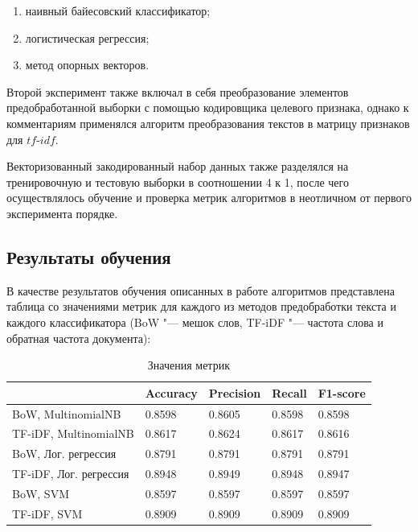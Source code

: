 \documentclass[bachelor, och, coursework]{SCWorks}
\begin{document}
        \begin{enumerate}
            \item наивный байесовский классификатор;
            \item логистическая регрессия;
            \item метод опорных векторов.
        \end{enumerate}

        Второй эксперимент также включал в себя преобразование элементов
        предобработанной выборки с помощью кодировщика целевого признака, однако
        к комментариям применялся алгоритм преобразования текстов в матрицу
        признаков для $tf \text{-} idf$.

        Векторизованный закодированный набор данных также разделялся на
        тренировочную и тестовую выборки в соотношении 4 к 1, после чего
        осуществлялось обучение и проверка метрик алгоритмов в неотличном от
        первого эксперимента порядке.

    \subsection{Результаты обучения}

        В качестве результатов обучения описанных в работе алгоритмов
        представлена таблица со значениями метрик для каждого из методов
        предобработки текста и каждого классификатора (BoW "--- мешок слов,
        TF-iDF "--- частота слова и обратная частота документа):

        \begin{table}[h]
            \centering
            \begin{tabular}{|l|l|l|l|l|}
            \hline
                                                          & Accuracy & Precision & Recall & F1-score \\ \hline
            BoW, MultinomialNB & 0.8598   & 0.8605    & 0.8598 & 0.8598   \\ \hline
            TF-iDF, MultinomialNB     & 0.8617   & 0.8624    & 0.8617 & 0.8616   \\ \hline
            BoW, Лог. регрессия           & 0.8791   & 0.8791    & 0.8791 & 0.8791  \\ \hline
            TF-iDF, Лог. регрессия               & 0.8948   & 0.8949    & 0.8948 & 0.8947   \\ \hline
            BoW, SVM            & 0.8597   & 0.8597    & 0.8597 & 0.8597      \\ \hline
            TF-iDF, SVM                & 0.8909   & 0.8909    & 0.8909 & 0.8909   \\ \hline
            \end{tabular}
            \captionsetup{justification=centering}
            \caption{Значения метрик}
        \end{table}
\end{document}
